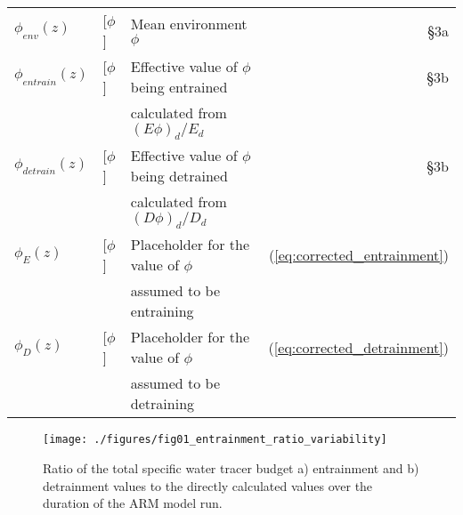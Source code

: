 \documentclass[12pt]{article}
\begin{document}
\begin{appendix}
\begin{table}[t]
\begin{center}
\begin{tabular}{lllr}
 $\phi_{env}(z)$ 
    & [$\phi$]
    & Mean environment $\phi$
    & \S 3a \\

 $\phi_{entrain}(z)$
    & [$\phi$]
    & Effective value of $\phi$ being entrained
    & \S 3b \\
   && calculated from $(E\phi)_d/E_d$& \\

 $\phi_{detrain}(z)$
    & [$\phi$]
    & Effective value of $\phi$ being detrained
    & \S 3b \\
   && calculated from $(D\phi)_d/D_d$ & \\

 $\phi_E(z)$
    & [$\phi$]
    & Placeholder for the value of $\phi$
    & (\ref{eq:corrected_entrainment}) \\
   && assumed to be entraining & \\

 $\phi_D(z)$
    & [$\phi$]
    & Placeholder for the value of $\phi$
    & (\ref{eq:corrected_detrainment}) \\
   && assumed to be detraining & \\
\hline
\end{tabular}
\end{center}
\end{table}

\end{appendix}



{}
{\clearpage}




\begin{figure}[t]
  \noindent
  \texttt{[image: ./figures/fig01\_entrainment\_ratio\_variability]}\\
  \caption{Ratio of the total specific water tracer budget a) 
  entrainment and b) detrainment values to the directly calculated 
  values over the duration of the ARM model run.}
  \label{fig:entrainment_ratio_variability}
\end{figure}
\end{document}
